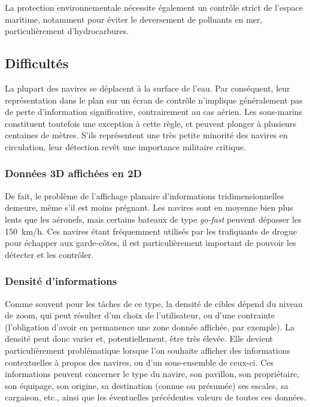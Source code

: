 	La protection environnementale nécessite également un contrôle strict de l'espace maritime, notamment pour éviter le deversement de polluants en mer, particulièrement d'hydrocarbures.
	
	\FloatBarrier \subsection{Difficultés}
	La plupart des navires se déplacent à la surface de l'eau. Par conséquent, leur représentation dans le plan sur un écran de contrôle n'implique généralement pas de perte d'information significative, contrairement au cas aérien. Les sous-marins constituent toutefois une exception à cette règle, et peuvent plonger à plusieurs centaines de mètres. S'ils représentent une très petite minorité des navires en circulation, leur détection revêt une importance militaire critique.
	
	\subsubsection{Données 3D affichées en 2D}
	De fait, le problème de l'affichage planaire d'informations tridimensionnelles demeure, même s'il est moins prégnant. Les navires sont en moyenne bien plus lents que les aéronefs, mais certains bateaux de type \emph{go-fast} peuvent dépasser les 150~km/h. Ces navires étant fréquemment utilisés par les trafiquants de drogue pour échapper aux garde-côtes, il est particulièrement important de pouvoir les détecter et les contrôler.
	
	\subsubsection{Densité d'informations}
	Comme souvent pour les tâches de ce type, la densité de cibles dépend du niveau de zoom, qui peut résulter d'un choix de l'utilisateur, ou d'une contrainte (l'obligation d'avoir en permanence une zone donnée affichée, par exemple). La densité peut donc varier et, potentiellement, être très élevée. Elle devient particulièrement problématique lorsque l'on souhaite afficher des informations contextuelles à propos des navires, ou d'un sous-ensemble de ceux-ci. Ces informations peuvent concerner le type du navire, son pavillon, son propriétaire, son équipage, son origine, sa destination (connue ou présumée) ses escales, sa cargaison, etc., ainsi que les éventuelles précédentes valeurs de toutes ces données.
	
